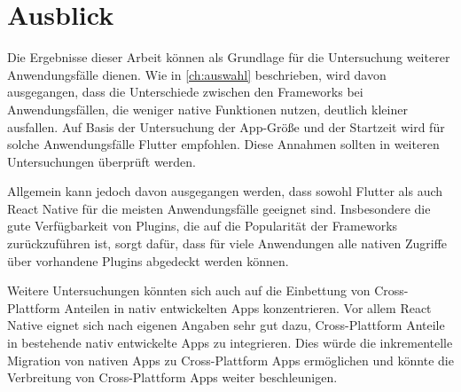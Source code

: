 \section{Ausblick}

Die Ergebnisse dieser Arbeit können als Grundlage für die Untersuchung weiterer Anwendungsfälle dienen.
Wie in \autoref{ch:auswahl} beschrieben, wird davon ausgegangen, dass die Unterschiede zwischen den Frameworks bei Anwendungsfällen, die weniger native Funktionen nutzen, deutlich kleiner ausfallen.
Auf Basis der Untersuchung der App-Größe und der Startzeit wird für solche Anwendungsfälle Flutter empfohlen.
Diese Annahmen sollten in weiteren Untersuchungen überprüft werden.

Allgemein kann jedoch davon ausgegangen werden, dass sowohl Flutter als auch React Native für die meisten Anwendungsfälle geeignet sind.
Insbesondere die gute Verfügbarkeit von Plugins, die auf die Popularität der Frameworks zurückzuführen ist, sorgt dafür, dass für viele Anwendungen alle nativen Zugriffe über vorhandene Plugins abgedeckt werden können.

Weitere Untersuchungen könnten sich auch auf die Einbettung von Cross-Plattform Anteilen in nativ entwickelten Apps konzentrieren.
Vor allem React Native eignet sich nach eigenen Angaben sehr gut dazu, Cross-Plattform Anteile in bestehende nativ entwickelte Apps zu integrieren.
Dies würde die inkrementelle Migration von nativen Apps zu Cross-Plattform Apps ermöglichen und könnte die Verbreitung von Cross-Plattform Apps weiter beschleunigen.